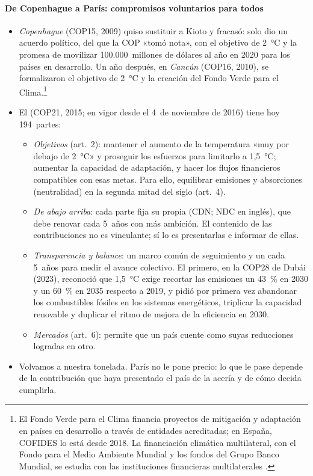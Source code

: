 \documentclass[11pt]{article}
\begin{document}
\paragraph{De Copenhague a París: compromisos voluntarios para todos}

\begin{itemize}
\item \emph{Copenhague} (COP15, 2009) quiso sustituir a Kioto y fracasó: solo dio un acuerdo político, del que la COP «tomó nota», con el objetivo de 2~°C y la promesa de movilizar 100.000~millones de dólares al año en 2020 para los países en desarrollo\nocite{CMNUCC2009Copenhague}. Un año después, en \emph{Cancún} (COP16, 2010), se formalizaron el objetivo de 2~°C y la creación del Fondo Verde para el Clima\nocite{CMNUCC2010Cancun}.\footnote{El Fondo Verde para el Clima financia proyectos de mitigación y adaptación en países en desarrollo a través de entidades acreditadas; en España, COFIDES lo está desde 2018\nocite{GCF2025COFIDES}. La financiación climática multilateral, con el Fondo para el Medio Ambiente Mundial y los fondos del Grupo Banco Mundial, se estudia con las instituciones financieras multilaterales .}
\item El  (COP21, 2015; en vigor desde el 4~de noviembre de 2016) tiene hoy 194~partes\nocite{CMNUCC2015Paris,ONU2026Paris}:
  \begin{itemize}
  \item \emph{Objetivos} (art.~2): mantener el aumento de la temperatura «muy por debajo de 2~°C» y proseguir los esfuerzos para limitarlo a 1,5~°C; aumentar la capacidad de adaptación, y hacer los flujos financieros compatibles con esas metas. Para ello, equilibrar emisiones y absorciones (neutralidad) en la segunda mitad del siglo (art.~4).
  \item \emph{De abajo arriba}: cada parte fija su propia  (CDN; NDC en inglés), que debe renovar cada 5~años con más ambición. El contenido de las contribuciones no es vinculante; sí lo es presentarlas e informar de ellas.
  \item \emph{Transparencia y balance}: un marco común de seguimiento y un  cada 5~años para medir el avance colectivo. El primero, en la COP28 de Dubái (2023), reconoció que 1,5~°C exige recortar las emisiones un 43~\% en 2030 y un 60~\% en 2035 respecto a 2019, y pidió por primera vez abandonar los combustibles fósiles en los sistemas energéticos, triplicar la capacidad renovable y duplicar el ritmo de mejora de la eficiencia en 2030\nocite{CMNUCC2023Balance}.
  \item \emph{Mercados} (art.~6): permite que un país cuente como suyas reducciones logradas en otro.
  \end{itemize}
\item Volvamos a nuestra tonelada. París no le pone precio: lo que le pase depende de la contribución que haya presentado el país de la acería y de cómo decida cumplirla.
\end{itemize}
\end{document}
